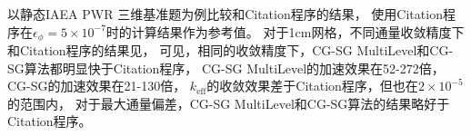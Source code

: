 \begin{comment}

由于\ProgramName 和Citation均使用迭代算法进行求解，
而迭代算法的计算时间和通量的收敛程度有直接关系，
一般来说计算时间和迭代次数成正比。
但无论是计算本征值的外迭代还是求解线性方程的内迭代，
\ProgramName 和Citation都使用了不同的迭代方式，
两者对偏差的估计方式也有所差别，不宜直接进行比较。

\begin{figure}
\centering
\texttt{[image: testresult\_iaea\_1cm]}
\caption{\label{fig:testresult.iaea}静态IAEA三维基准题1cm网格\ProgramName 与Citation的计算时间-通量最大偏差图}
\end{figure}

在实际应用中，相同偏差时的计算时间才能反映程序间的速度差异，
这里分别选取不同的收敛精度使用\ProgramName 和Citation进行计算，
绘制两者的计算时间--偏差图，
这里取Citation在$\epsilon_\phi=5\times10^{-7}$时的计算结果作为参考值，
对于静态IAEA PWR 三维基准题1cm网格划分，
\ProgramName 与Citation在不同精度下的计算时间见\floatref{fig:testresult.iaea}，
可见不同的算法的计算时间和结果精度的关系差异很大，对结果进行拟合得
\begin{align}
  &T_\mathrm{CG-SG\ ML} = \exp\pb{-0.235151\log \epsilon_\phi-146.097\epsilon_\phi+1.87266}\\
  &T_\mathrm{CG-SG} = \exp\pb{-0.307056\log \epsilon_\phi+2.02687} \\
  &T_\mathrm{Citation} = \exp\pb{-414.444\epsilon_\phi+10.7569} 
\end{align}
取结果偏差为$\epsilon_\phi=0.01,0.003,0.001$进行比较得

\begin{table}
\centering
\begin{tabular}{crrr}
\topline
$\epsilon_\phi$ & $T_\mathrm{Citation}$ & $T_\mathrm{CG-SG\ ML}$ & $T_\mathrm{CG-SG}$\\
\midline
0.01  &   744.31 &  4.46 & 31.22 \\
0.003 & 13542.20 & 16.45 & 45.18 \\
0.001 & 31022.10 & 28.53 & 63.30 \\
\bottomline
\end{tabular}
\end{table}

\end{comment}

以静态IAEA PWR 三维基准题为例比较\ProgramName 和Citation程序的结果，
使用Citation程序在$\epsilon_\phi=5\times10^{-7}$时的计算结果作为参考值。
对于1cm网格，不同通量收敛精度下\ProgramName 和Citation程序的结果见，
可见，相同的收敛精度下，CG-SG MultiLevel和CG-SG算法都明显快于Citation程序，
CG-SG MultiLevel的加速效果在52-272倍，CG-SG的加速效果在21-130倍，
$k_\mathrm{eff}$的收敛效果差于Citation程序，但也在$2\times10^{-5}$的范围内，
对于最大通量偏差，CG-SG MultiLevel和CG-SG算法的结果略好于Citation程序。

